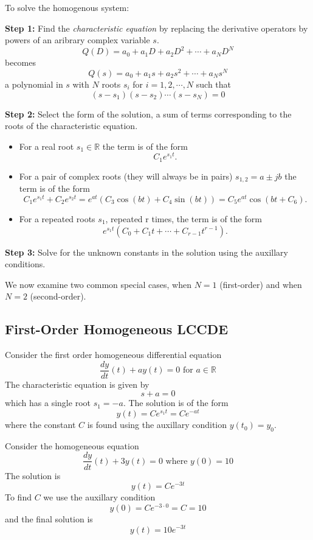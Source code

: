 To solve the homogenous system:

\textbf{Step 1:} Find the \emph{characteristic equation} by replacing the derivative operators by powers of an aribrary complex variable $s$.
\[
Q(D) = a_0 + a_1D + a_2D^2 + \cdots + a_ND^N
\]
becomes
\[
Q(s) = a_0 + a_1s + a_2s^2 + \cdots + a_Ns^N
\]
a polynomial in $s$ with $N$ roots $s_i$ for $i = 1, 2, \cdots, N$ such that
\[
(s - s_1)(s-s_2)\cdots(s-s_N) = 0
\]

\textbf{Step 2:} Select the form of the solution, a sum of terms corresponding to the roots of the characteristic equation.

\begin{itemize}
\item For a real root $s_1\in \mathbb{R}$ the term is of the form
  \[
  C_1 e^{s_1 t}.
  \]
\item For a pair of complex roots (they will always be in pairs) $s_{1,2} = a \pm jb$ the term is of the form
  \[
  C_1 e^{s_1 t} + C_2 e^{s_2 t} = e^{a t}\left(C_3\cos(bt) + C_4\sin(bt)\right) = C_5 e^{a t}\cos(bt + C_6).
  \]
\item For a repeated roots $s_1$, repeated r times, the term is of the form
  \[
  e^{s_1 t} (C_0 + C_1 t + \cdots + C_{r-1} t^{r-1}).\]
\end{itemize}

\textbf{Step 3:} Solve for the unknown constants in the solution using the auxillary conditions. 

We now examine two common special cases, when $N=1$ (first-order) and when $N=2$ (second-order).

\subsection{First-Order Homogeneous LCCDE}

Consider the first order homogeneous differential equation
\[
\frac{dy}{dt}(t) + ay(t) = 0 \mbox{ for } a \in \mathbb{R}
\]
The characteristic equation is given by
\[
s + a = 0
\]
which has a single root $s_1 = -a$. The solution is of the form
\[
y(t) = Ce^{s_1 t} = Ce^{-a t} 
\]
where the constant $C$ is found using the auxillary condition $y(t_0) = y_0$.

\begin{example}
Consider the homogeneous equation
\[
\frac{dy}{dt}(t) + 3y(t) = 0 \mbox{ where } y(0) = 10
\]
The solution is
\[
y(t) = Ce^{-3 t} 
\]
To find $C$ we use the auxillary condition
\[
y(0) = Ce^{-3 \cdot 0} = C = 10
\]
and the final solution is
\[
y(t) = 10e^{-3 t} 
\]
\end{example}

